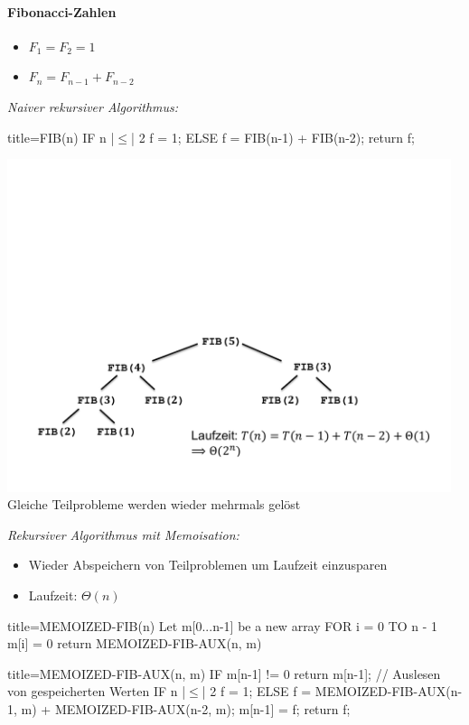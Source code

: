 \documentclass[
    ngerman,
    color=3b,
    dark_mode,
    load_common, %
    summary,
    boxarc,
]{tuda_summary}
\begin{document}
\paragraph{Fibonacci-Zahlen}
\begin{itemize}
    \item $F_1 = F_2 = 1$
    \item $F_n = F_{n-1} + F_{n-2}$
\end{itemize}
\textit{Naiver rekursiver Algorithmus:}

\begin{codeBlock}[autogobble,escapeinside=||]{title={FIB(n)}}
    IF n |$\leq$| 2
        f = 1;
    ELSE
        f = FIB(n-1) + FIB(n-2);
    return f;
\end{codeBlock}
\includegraphics[width=13cm]{pictures/fibBaum.pdf}\\
Gleiche Teilprobleme werden wieder mehrmals gelöst

\clearpage
\textit{Rekursiver Algorithmus mit Memoisation:}
\begin{itemize}
    \item Wieder Abspeichern von Teilproblemen um Laufzeit einzusparen
    \item Laufzeit: $\Theta(n)$
\end{itemize}

\begin{codeBlock}[autogobble,escapeinside=||]{title={MEMOIZED-FIB(n)}}
    Let m[0...n-1] be a new array
    FOR i = 0 TO n - 1
        m[i] = 0
    return MEMOIZED-FIB-AUX(n, m)
\end{codeBlock}
\begin{codeBlock}[autogobble,escapeinside=||]{title={MEMOIZED-FIB-AUX(n, m)}}
    IF m[n-1] != 0
        return m[n-1];      // Auslesen von gespeicherten Werten
    IF n |$\leq$| 2
        f = 1;
    ELSE
        f = MEMOIZED-FIB-AUX(n-1, m) + MEMOIZED-FIB-AUX(n-2, m);
    m[n-1] = f;
    return f;
\end{codeBlock}
\end{document}
